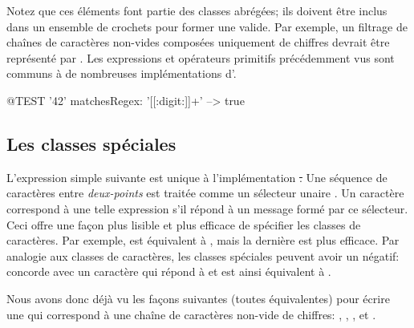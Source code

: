 \documentclass[a4paper,10pt,twoside]{book}
\begin{document}
Notez que ces éléments font partie des classes abrégées; ils doivent
être inclus dans un ensemble de crochets pour former une \expreg
valide. Par exemple, un filtrage de chaînes de caractères non-vides composées
uniquement de chiffres devrait être représenté par \ct{[[:digit:]]+}.
Les expressions et opérateurs primitifs précédemment vus sont communs
à de nombreuses implémentations d'\expregs.

\begin{code}{@TEST}
'42' matchesRegex: '[[:digit:]]+' --> true
\end{code}

\subsection{Les classes spéciales}
L'expression simple suivante est unique à l'implémentation \st. Une
séquence de caractères entre \emph{deux-points} est traitée comme un
sélecteur unaire .
Un caractère correspond à une telle expression s'il répond 
à un message formé par ce sélecteur.
Ceci offre une façon plus lisible et plus efficace de spécifier les
classes de caractères. Par exemple, \ct{[0-9]} est équivalent à
, mais la dernière est plus efficace. Par analogie aux
classes de caractères, les classes spéciales peuvent avoir un négatif:
 concorde avec un caractère qui répond  à
  et est ainsi équivalent à  \ct{[CARET0-9]}.

Nous avons donc déjà vu les façons suivantes (toutes équivalentes) pour écrire une \expreg qui
correspond à une chaîne de caractères non-vide de chiffres:
\ct{[0-9]+}, \ct{\d+}, \ct{[\d]+}, \ct{[[:digit:]]+} et .
\end{document}

